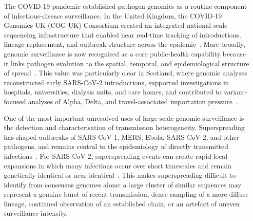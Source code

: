 \documentclass[10pt,letterpaper]{article}
\begin{document}
The COVID-19 pandemic established pathogen genomics as a routine component of infectious-disease surveillance. In the United Kingdom, the COVID-19 Genomics UK (COG-UK) Consortium created an integrated national-scale sequencing infrastructure that enabled near real-time tracking of introductions, lineage replacement, and outbreak structure across the epidemic~\cite{COGUK2020,duPlessis2021}. More broadly, genomic surveillance is now recognised as a core public-health capability because it links pathogen evolution to the spatial, temporal, and epidemiological structure of spread~\cite{Armstrong2019,Struelens2024,Black2020}. This value was particularly clear in Scotland, where genomic analyses reconstructed early SARS-CoV-2 introductions, supported investigations in hospitals, universities, dialysis units, and care homes, and contributed to variant-focused analyses of Alpha, Delta, and travel-associated importation pressure~\cite{daSilvaFilipe2021,Li2021,Nickbakhsh2022,Stirrup2021,Stirrup2022,Cotton2023,Pascall2023,Sheikh2021,McLachlan2024}.

One of the most important unresolved uses of large-scale genomic surveillance is the detection and characterisation of transmission heterogeneity. Superspreading has shaped outbreaks of SARS-CoV-1, MERS, Ebola, SARS-CoV-2, and other pathogens, and remains central to the epidemiology of directly transmitted infections~\cite{LloydSmith2005,Shen2004,Lau2017,Cho2016,Lee2020}. For SARS-CoV-2, superspreading events can create rapid local expansions in which many infections occur over short timescales and remain genetically identical or near-identical~\cite{Lemieux2021,Valesano2021,Bendall2022}. This makes superspreading difficult to identify from consensus genomes alone: a large cluster of similar sequences may represent a genuine burst of recent transmission, dense sampling of a more diffuse lineage, continued observation of an established chain, or an artefact of uneven surveillance intensity.
\end{document}

